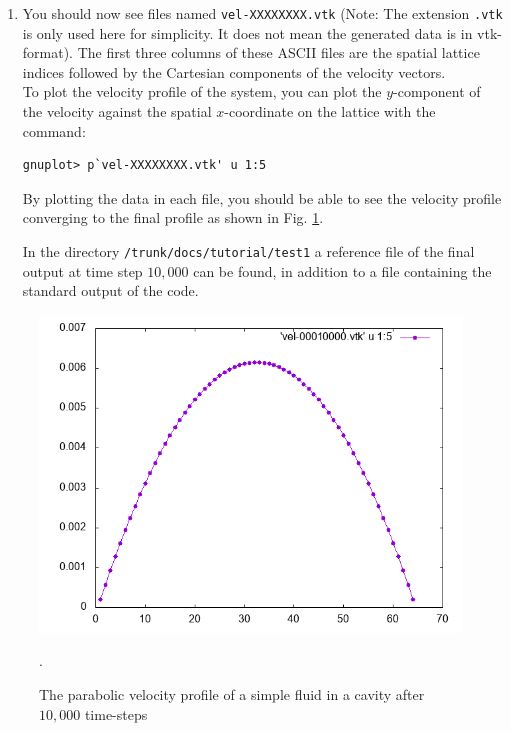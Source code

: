 \documentclass[11pt,twoside,a4paper]{article}
\begin{document}
\begin{enumerate}
\begin{enumerate}
to be processed.
\item \texttt{vel=1} for velocity post-processing, 
\item The other flags should be set to zero, e.g. \texttt{phi=0}. 
\end{enumerate}
\item You should now see files named \texttt{vel-XXXXXXXX.vtk} (Note: The extension \texttt{.vtk} is only used here for simplicity.
It does not mean the generated data is in vtk-format). 
The first three columns of these ASCII files are the spatial lattice indices followed by the Cartesian components of the velocity vectors.\\

To plot the velocity profile of the system, you can plot the $y$-component of the velocity against 
the spatial $x$-coordinate on the lattice with the command:
\begin{lstlisting}
gnuplot> p`vel-XXXXXXXX.vtk' u 1:5
\end{lstlisting} 
By plotting the data in each file, you should be able to see the velocity profile converging to the final profile 
as shown in Fig. \ref{fig:velocityProfile}. 

In the directory \texttt{/trunk/docs/tutorial/test1} a reference file of the final 
output at time step $10,000$ can be found, in addition to a file containing the standard output of the code.
\end{enumerate} 

\begin{figure}[h]
\begin{center}
\includegraphics[width=0.6\linewidth]{velProf.png}
  \caption{The parabolic velocity profile of a simple fluid in a cavity after $10,000$ time-steps}.
  \label{fig:velocityProfile}
  \end{center}
\end{figure}

%
\end{document}
